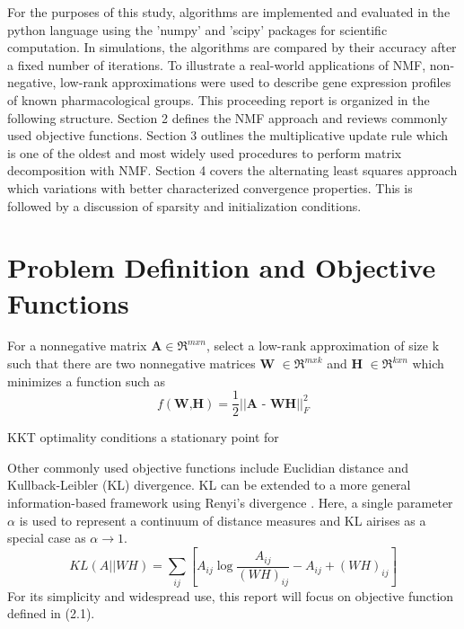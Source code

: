 \documentclass[final,leqno,onefignum,onetabnum]{siamltex1213}
\begin{document}
For the purposes of this study, algorithms are implemented and evaluated in the python language using the 'numpy' and 'scipy' packages for scientific computation. In simulations, the algorithms are compared by their accuracy after a fixed number of iterations. To illustrate a real-world applications of NMF, non-negative, low-rank approximations were used to describe gene expression profiles of known pharmacological groups. This proceeding report is organized in the following structure. Section 2 defines the NMF approach and reviews commonly used objective functions. Section 3 outlines the multiplicative update rule which is one of the oldest and most widely used procedures to perform matrix decomposition with NMF. Section 4 covers the alternating least squares approach which variations with better characterized convergence properties. This is followed by a discussion of sparsity and initialization conditions. 

\section{Problem Definition and Objective Functions}

\begin{definition} For a nonnegative matrix $\textbf{A} \in \Re^{m x n} $, select a low-rank approximation of size k such that there are two nonnegative matrices \textbf{W} $ \in \Re^{m x k}$ and \textbf{H} $ \in \Re^{k x n}$ which minimizes a function such as 
\begin{equation}\label{ObjEuc}
 f( \textbf{W,H}) = \frac{1}{2} || \textbf{A - WH} || ^{2}_{F}
\end{equation}

\end{definition}

KKT optimality conditions a stationary point for 




Other commonly used objective functions include Euclidian distance and Kullback-Leibler (KL) divergence. KL can be extended to a more general information-based framework using Renyi's divergence \cite{Dev1}. Here, a single parameter $\alpha$ is used to represent a continuum of distance measures and KL airises as a special case as $\alpha \to 1$. 
\begin{equation}\label{ObjKL}
 KL(A || WH) = \sum_{ij}{[A_{ij} \log{ \frac{A_{ij}}{(WH)_{ij}} - A_{ij} + (WH)_{ij}} ]}
\end{equation}
For its simplicity and widespread use, this report will focus on objective function defined in (2.1). 
\end{document}
